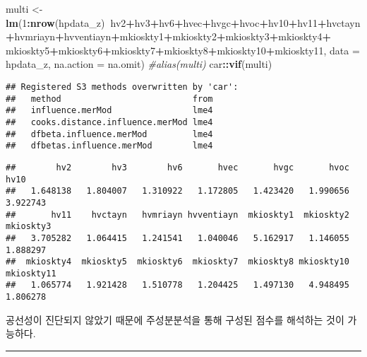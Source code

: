 \documentclass[
]{article}
\newenvironment{Shaded}{\begin{snugshade}}{\end{snugshade}}
\newcommand{\CommentTok}[1]{\textcolor[rgb]{0.56,0.35,0.01}{\textit{#1}}}
\newcommand{\DataTypeTok}[1]{\textcolor[rgb]{0.13,0.29,0.53}{#1}}
\newcommand{\DecValTok}[1]{\textcolor[rgb]{0.00,0.00,0.81}{#1}}
\newcommand{\KeywordTok}[1]{\textcolor[rgb]{0.13,0.29,0.53}{\textbf{#1}}}
\newcommand{\NormalTok}[1]{#1}
\newcommand{\OperatorTok}[1]{\textcolor[rgb]{0.81,0.36,0.00}{\textbf{#1}}}
\newcommand{\StringTok}[1]{\textcolor[rgb]{0.31,0.60,0.02}{#1}}
\begin{document}
\begin{Shaded}
\begin{Highlighting}[]
\NormalTok{multi <-}\StringTok{ }\KeywordTok{lm}\NormalTok{(}\DecValTok{1}\OperatorTok{:}\KeywordTok{nrow}\NormalTok{(hpdata_z)}\OperatorTok{~}\NormalTok{hv2}\OperatorTok{+}\NormalTok{hv3}\OperatorTok{+}\NormalTok{hv6}\OperatorTok{+}\NormalTok{hvec}\OperatorTok{+}\NormalTok{hvgc}\OperatorTok{+}\NormalTok{hvoc}\OperatorTok{+}\NormalTok{hv10}\OperatorTok{+}\NormalTok{hv11}\OperatorTok{+}\NormalTok{hvctayn}\OperatorTok{+}\NormalTok{hvmriayn}\OperatorTok{+}\NormalTok{hvventiayn}\OperatorTok{+}\NormalTok{mkioskty1}\OperatorTok{+}\NormalTok{mkioskty2}\OperatorTok{+}\NormalTok{mkioskty3}\OperatorTok{+}\NormalTok{mkioskty4}\OperatorTok{+}\StringTok{ }\NormalTok{mkioskty5}\OperatorTok{+}\NormalTok{mkioskty6}\OperatorTok{+}\NormalTok{mkioskty7}\OperatorTok{+}\NormalTok{mkioskty8}\OperatorTok{+}\NormalTok{mkioskty10}\OperatorTok{+}\NormalTok{mkioskty11, }\DataTypeTok{data =}\NormalTok{ hpdata_z, }\DataTypeTok{na.action =}\NormalTok{ na.omit)}
\CommentTok{#alias(multi)}
\NormalTok{car}\OperatorTok{::}\KeywordTok{vif}\NormalTok{(multi)}
\end{Highlighting}
\end{Shaded}

\begin{verbatim}
## Registered S3 methods overwritten by 'car':
##   method                          from
##   influence.merMod                lme4
##   cooks.distance.influence.merMod lme4
##   dfbeta.influence.merMod         lme4
##   dfbetas.influence.merMod        lme4
\end{verbatim}

\begin{verbatim}
##        hv2        hv3        hv6       hvec       hvgc       hvoc       hv10 
##   1.648138   1.804007   1.310922   1.172805   1.423420   1.990656   3.922743 
##       hv11    hvctayn   hvmriayn hvventiayn  mkioskty1  mkioskty2  mkioskty3 
##   3.705282   1.064415   1.241541   1.040046   5.162917   1.146055   1.888297 
##  mkioskty4  mkioskty5  mkioskty6  mkioskty7  mkioskty8 mkioskty10 mkioskty11 
##   1.065774   1.921428   1.510778   1.204425   1.497130   4.948495   1.806278
\end{verbatim}

공선성이 진단되지 않았기 때문에 주성분분석을 통해 구성된 점수를 해석하는
것이 가능하다.

\begin{center}\rule{0.5\linewidth}{0.5pt}\end{center}
\end{document}
